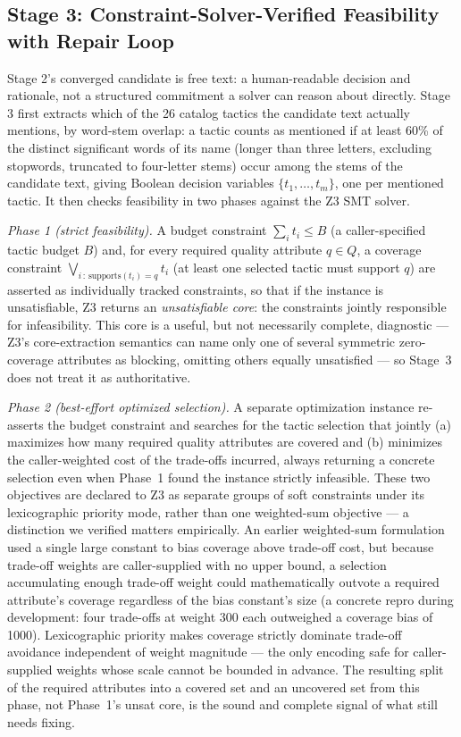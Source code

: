 \documentclass[preprint,12pt,authoryear]{elsarticle}
\renewcommand{\_}{\textunderscore\allowbreak{}}
\begin{document}
\subsection{Stage 3: Constraint-Solver-Verified Feasibility with Repair Loop}
\label{sec:method-stage3}

Stage 2's converged candidate is free text: a human-readable decision and rationale, not a structured commitment a solver can reason about directly. Stage 3 first extracts which of the 26 catalog tactics the candidate text actually mentions, by word-stem overlap: a tactic counts as mentioned if at least 60\% of the distinct significant words of its name (longer than three letters, excluding stopwords, truncated to four-letter stems) occur among the stems of the candidate text, giving Boolean decision variables $\{t_1, \ldots, t_m\}$, one per mentioned tactic. It then checks feasibility in two phases against the Z3 SMT solver.

\emph{Phase 1 (strict feasibility).} A budget constraint $\sum_i t_i \leq B$ (a caller-specified tactic budget $B$) and, for every required quality attribute $q \in Q$, a coverage constraint $\bigvee_{i \,:\, \mathrm{supports}(t_i) = q} t_i$ (at least one selected tactic must support $q$) are asserted as individually tracked constraints, so that if the instance is unsatisfiable, Z3 returns an \emph{unsatisfiable core}: the constraints jointly responsible for infeasibility. This core is a useful, but not necessarily complete, diagnostic --- Z3's core-extraction semantics can name only one of several symmetric zero-coverage attributes as blocking, omitting others equally unsatisfied --- so Stage~3 does not treat it as authoritative.

\emph{Phase 2 (best-effort optimized selection).} A separate optimization instance re-asserts the budget constraint and searches for the tactic selection that jointly (a) maximizes how many required quality attributes are covered and (b) minimizes the caller-weighted cost of the trade-offs incurred, always returning a concrete selection even when Phase~1 found the instance strictly infeasible. These two objectives are declared to Z3 as separate groups of soft constraints under its lexicographic priority mode, rather than one weighted-sum objective --- a distinction we verified matters empirically. An earlier weighted-sum formulation used a single large constant to bias coverage above trade-off cost, but because trade-off weights are caller-supplied with no upper bound, a selection accumulating enough trade-off weight could mathematically outvote a required attribute's coverage regardless of the bias constant's size (a concrete repro during development: four trade-offs at weight 300 each outweighed a coverage bias of 1000). Lexicographic priority makes coverage strictly dominate trade-off avoidance independent of weight magnitude --- the only encoding safe for caller-supplied weights whose scale cannot be bounded in advance. The resulting split of the required attributes into a covered set and an uncovered set from this phase, not Phase~1's unsat core, is the sound and complete signal of what still needs fixing.
\end{document}
